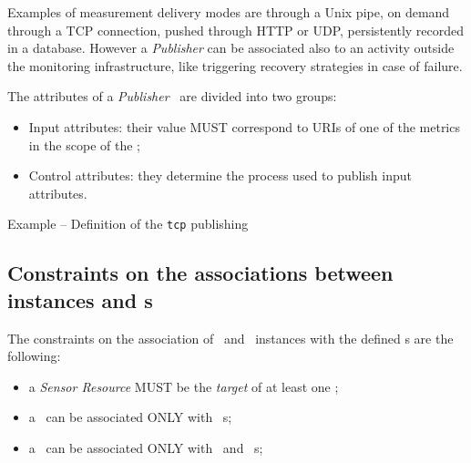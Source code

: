 \documentclass[12pt]{article}  %
\begin{document}

Examples of measurement delivery modes are through a Unix pipe, on demand through a TCP connection, pushed through HTTP or UDP, persistently recorded in a database. However a {\em Publisher} can be associated also to an activity outside the monitoring infrastructure, like triggering recovery strategies in case of failure.

The attributes of a {\em Publisher} \mi\ are divided into two groups:

\begin{itemize}
\item Input attributes: their value MUST correspond to URIs of one of the metrics in the scope of the \sens;
\item Control attributes: they determine the process used to publish input attributes.
\end{itemize}

\begin{table}
\caption{Example -- Definition of the {\tt \small tcp} publishing \mi } 
\end{table}


\subsection{Constraints on the associations between instances and \mi s}

The constraints on the association of \sens\ and \coll\ instances with the defined \mi s are the following:

\begin{itemize}

\item a {\em Sensor Resource} MUST be the {\em target} of at least one \coll ;

\item a \coll\ can be associated ONLY with \metr\ \mi s;

\item a \sens\ can be associated ONLY with \publ\ and \aggr\ \mi s;

\end{itemize}
\end{document}

